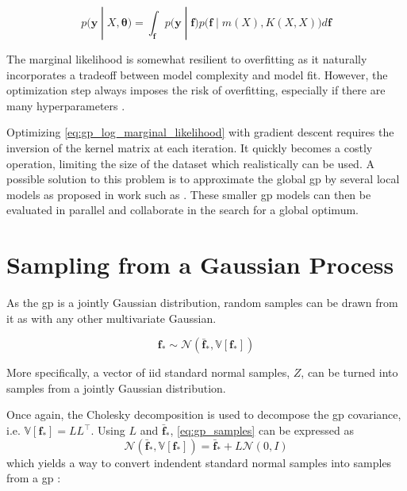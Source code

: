 \begin{equation}
    p(\boldsymbol{y} \; | \; X, \boldsymbol{\theta}) = \int_{\boldsymbol{f}} p\big(\boldsymbol{y} \;| \; \boldsymbol{f}\big) p\big(\boldsymbol{f} \; |\; m(X), K(X, X)\big) d\boldsymbol{f}
\end{equation}

The marginal likelihood is somewhat resilient to overfitting as it naturally incorporates a tradeoff between model complexity and model fit. However, the optimization step always imposes the risk of overfitting, especially if there are many hyperparameters \cite{rasmussen}. 

Optimizing \cref{eq:gp_log_marginal_likelihood} with gradient descent requires the inversion of the kernel matrix at each iteration. It quickly becomes a costly operation, limiting the size of the dataset which realistically can be used. A possible solution to this problem is to approximate the global \acrshort{gp} by several local models as proposed in work such as \cite{paralell_gp_mle,paralell_gp_mle_2}. These smaller \acrshort{gp} models can then be evaluated in parallel and collaborate in the search for a global optimum. 

\section{Sampling from a Gaussian Process}\label{sec:gp_samples}
As the \acrshort{gp} is a jointly Gaussian distribution, random samples can be drawn from it as with any other multivariate Gaussian.

\begin{equation}\label{eq:gp_samples}
    \boldsymbol{f}_* \sim \mathcal{N}(\bar{\boldsymbol{f}}_*, \mathbb{V}[\boldsymbol{f}_*])
\end{equation}

More specifically, a vector of \acrshort{iid} standard normal samples, $Z$, can be turned into samples from a jointly Gaussian distribution.

Once again, the Cholesky decomposition is used to decompose the \acrshort{gp} covariance, i.e. $\mathbb{V}[\boldsymbol{f}_*] = L L^\intercal$. Using $L$ and $\bar{\boldsymbol{f}}_*$, \cref{eq:gp_samples} can be expressed as 
\begin{equation}
    \mathcal{N}(\bar{\boldsymbol{f}}_*, \mathbb{V}[\boldsymbol{f}_*]) = \bar{\boldsymbol{f}}_* + L \mathcal{N}(0, I)
\end{equation}
which yields a way to convert indendent standard normal samples into samples from a \acrshort{gp} \cite{rasmussen}:

